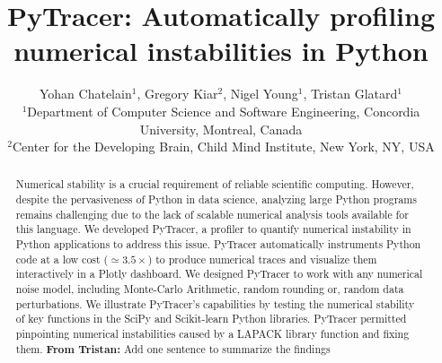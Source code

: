 \documentclass[11pt]{article}
\newcommand{\tristan}[1]{\color{orange}\textbf{From Tristan:} #1\color{black}\xspace}
\newcommand{\pytracer}[0]{PyTracer\xspace}
\begin{document}
\makeatletter
\let\orig@lstnumber=\thelstnumber
\newcommand\lstsetnumber[1]{\gdef\thelstnumber{#1}}
\newcommand\lstresetnumber{\global\let\thelstnumber=\orig@lstnumber}
\makeatother

\title{PyTracer: Automatically profiling numerical instabilities in Python}
\author{Yohan Chatelain$^1$, Gregory Kiar$^2$, Nigel Young$^1$, Tristan Glatard$^1$\\
$^1$Department of Computer Science and Software Engineering, Concordia University, Montreal, Canada\\
$^2$Center for the Developing Brain, Child Mind Institute, New York, NY, USA}
\date{}
\maketitle

\begin{abstract}
Numerical stability is a crucial requirement of reliable scientific computing. However, despite the pervasiveness of Python in data science, analyzing large Python programs remains challenging due to the lack of scalable numerical analysis tools available for this language. We developed \pytracer, a profiler to quantify numerical instability in Python applications to address this issue. \pytracer automatically instruments Python code at a low cost ($\simeq3.5\times$) to produce numerical traces and visualize them interactively in a Plotly dashboard. We designed \pytracer to work with any numerical noise model, including Monte-Carlo Arithmetic, random rounding or, random data perturbations. We illustrate \pytracer's capabilities by testing the numerical stability of key functions in the SciPy and Scikit-learn Python libraries. \pytracer permitted pinpointing numerical instabilities caused by a LAPACK library function and fixing them.
\tristan{Add one sentence to summarize the findings} 
\end{abstract}
\end{document}
